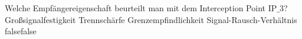     {Welche Empfängereigenschaft beurteilt man mit dem Interception Point IP$\_3$?}
    {Großsignalfestigkeit}
    {Trennschärfe}
    {Grenzempfindlichkeit}
    {Signal-Rausch-Verhältnis}
    {false}{false}